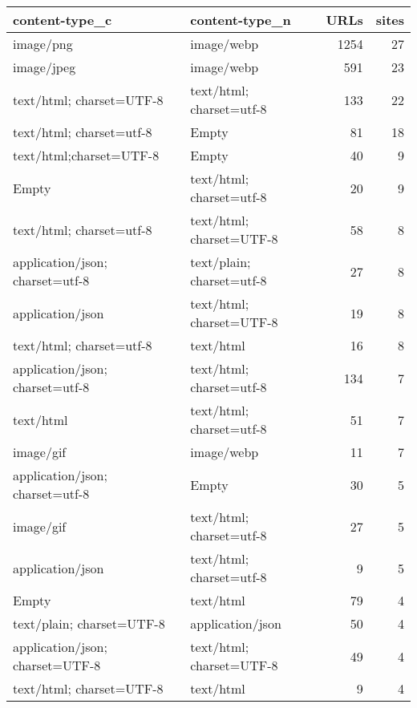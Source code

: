 \begin{tabular}{llrr}
\toprule
                 content-type\_c &            content-type\_n &  URLs &  sites \\
\midrule
                      image/png &                image/webp &  1254 &     27 \\
                     image/jpeg &                image/webp &   591 &     23 \\
       text/html; charset=UTF-8 &  text/html; charset=utf-8 &   133 &     22 \\
       text/html; charset=utf-8 &                     Empty &    81 &     18 \\
        text/html;charset=UTF-8 &                     Empty &    40 &      9 \\
                          Empty &  text/html; charset=utf-8 &    20 &      9 \\
       text/html; charset=utf-8 &  text/html; charset=UTF-8 &    58 &      8 \\
application/json; charset=utf-8 & text/plain; charset=utf-8 &    27 &      8 \\
               application/json &  text/html; charset=UTF-8 &    19 &      8 \\
       text/html; charset=utf-8 &                 text/html &    16 &      8 \\
application/json; charset=utf-8 &  text/html; charset=utf-8 &   134 &      7 \\
                      text/html &  text/html; charset=utf-8 &    51 &      7 \\
                      image/gif &                image/webp &    11 &      7 \\
application/json; charset=utf-8 &                     Empty &    30 &      5 \\
                      image/gif &  text/html; charset=utf-8 &    27 &      5 \\
               application/json &  text/html; charset=utf-8 &     9 &      5 \\
                          Empty &                 text/html &    79 &      4 \\
      text/plain; charset=UTF-8 &          application/json &    50 &      4 \\
application/json; charset=UTF-8 &  text/html; charset=UTF-8 &    49 &      4 \\
       text/html; charset=UTF-8 &                 text/html &     9 &      4 \\

\end{tabular}

